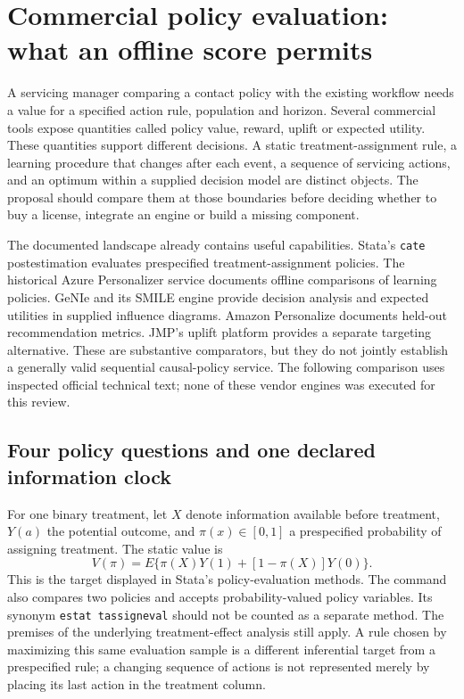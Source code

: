 \section{Commercial policy evaluation: what an offline score permits}
\label{exec16:commercial-policy}

A servicing manager comparing a contact policy with the existing workflow
needs a value for a specified action rule, population and horizon. Several
commercial tools expose quantities called policy value, reward, uplift or
expected utility. These quantities support different decisions. A static
treatment-assignment rule, a learning procedure that changes after each event,
a sequence of servicing actions, and an optimum within a supplied decision
model are distinct objects. The proposal should compare them at those
boundaries before deciding whether to buy a license, integrate an engine or
build a missing component.

The documented landscape already contains useful capabilities. Stata's
\texttt{cate} postestimation evaluates prespecified treatment-assignment
policies. The historical Azure Personalizer service documents offline
comparisons of learning policies. GeNIe and its SMILE engine provide decision
analysis and expected utilities in supplied influence diagrams. Amazon
Personalize documents held-out recommendation metrics. JMP's uplift platform
provides a separate targeting alternative. These are substantive comparators,
but they do not jointly establish a generally valid sequential causal-policy
service. The following comparison uses inspected official technical text;
none of these vendor engines was executed for this review.
\citep{exec13_ch_stata,exec16_cp_azure,exec16_cp_bayesfusion,exec16_cp_aws,exec13_ch_jmp_uplift}

\subsection{Four policy questions and one declared information clock}

For one binary treatment, let $X$ denote information available before treatment,
$Y(a)$ the potential outcome, and $\pi(x)\in[0,1]$ a prespecified probability
of assigning treatment. The static value is
\[
 V(\pi)=E\{\pi(X)Y(1)+[1-\pi(X)]Y(0)\}.
\]
This is the target displayed in Stata's policy-evaluation methods. The
command also compares two policies and accepts probability-valued policy
variables. Its synonym \texttt{estat tassigneval} should not be counted as
a separate method. The premises of the underlying treatment-effect analysis
still apply. A rule chosen by maximizing this same evaluation sample is a
different inferential target from a prespecified rule; a changing sequence of
actions is not represented merely by placing its last action in the treatment
column. \citep{exec13_ch_stata}

